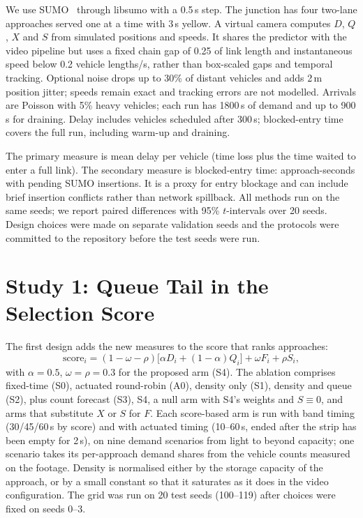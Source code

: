 \documentclass[journal]{IEEEtran}
\begin{document}
We use SUMO~\cite{sumo} through libsumo with a 0.5\,s step. The junction has four
two-lane approaches served one at a time with 3\,s yellow. A virtual camera computes
$D$, $Q$, $X$ and $S$ from simulated positions and speeds. It shares the predictor with the video pipeline but uses a fixed chain gap of 0.25 of link length and instantaneous speed below 0.2 vehicle lengths/s, rather than box-scaled gaps and temporal tracking. Optional noise drops up to 30\% of distant vehicles and adds 2\,m position jitter; speeds remain exact and tracking errors are not modelled. Arrivals are Poisson with 5\% heavy vehicles; each run has 1800\,s of demand and up to 900\,s for draining. Delay includes vehicles scheduled after 300\,s; blocked-entry time covers the full run, including warm-up and draining.

The primary measure is mean delay per vehicle (time loss plus the time waited to enter a
full link). The secondary measure is blocked-entry time: approach-seconds with pending SUMO insertions. It is a proxy for entry blockage and can include brief insertion conflicts rather than network spillback. All methods run on the same seeds; we report paired differences with 95\%
$t$-intervals over 20 seeds. Design choices were made on separate validation seeds and
the protocols were committed to the repository before the test seeds were run.

\section{Study 1: Queue Tail in the Selection Score}\label{sec:study1}
The first design adds the new measures to the score that ranks approaches:
\begin{equation}
\mathrm{score}_i=(1-\omega-\rho)\bigl[\alpha D_i+(1-\alpha)Q_i\bigr]+\omega F_i+\rho S_i ,
\end{equation}
with $\alpha=0.5$, $\omega=\rho=0.3$ for the proposed arm (S4). The ablation comprises
fixed-time (S0), actuated round-robin (A0), density only (S1), density and queue (S2),
plus count forecast (S3), S4, a null arm with S4's weights and $S\equiv 0$, and arms that
substitute $X$ or $S$ for $F$. Each score-based arm is run with band timing
(30/45/60\,s by score) and with actuated timing (10--60\,s, ended after the strip has been
empty for 2\,s), on nine demand scenarios from light to beyond capacity; one scenario
takes its per-approach demand shares from the vehicle counts measured on the footage.
Density is normalised either by the storage capacity of the approach, or by a small
constant so that it saturates as it does in the video configuration. The grid was run on
20 test seeds (100--119) after choices were fixed on seeds 0--3.
\end{document}
